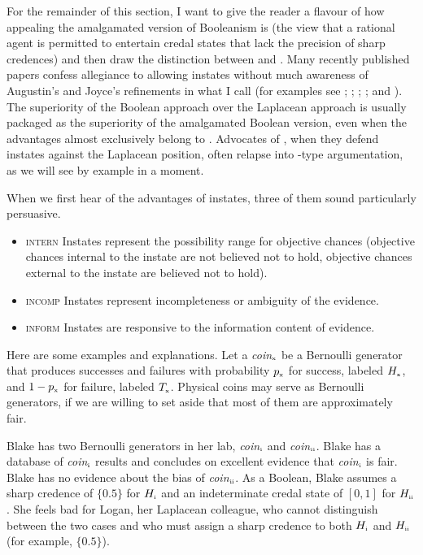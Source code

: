 \documentclass[phd,12pt,oneside]{ubcthesis}
\begin{document}
For the remainder of this section, I want to give the reader a flavour
of how appealing the amalgamated version of Booleanism is (the view
that a rational agent is permitted to entertain credal states that
lack the precision of sharp credences) and then draw the distinction
between {\anderson} and {\augustin}. Many recently published papers
confess allegiance to allowing instates without much awareness of
Augustin's and Joyce's refinements in what I call {\augustin} (for
examples see ; ;
; ; and
). The superiority of the Boolean approach over
the Laplacean approach is usually packaged as the superiority of the
amalgamated Boolean version, even when the advantages almost
exclusively belong to {\anderson}. Advocates of {\augustin}, when they
defend instates against the Laplacean position, often relapse into
{\anderson}-type argumentation, as we will see by example in a moment.

When we first hear of the advantages of instates, three of
them sound particularly persuasive.

\begin{itemize}
\item \textsc{intern} Instates represent the possibility range for
  objective chances (objective chances internal to the instate are not
  believed not to hold, objective chances external to the instate are
  believed not to hold).
\item \textsc{incomp} Instates represent incompleteness or
  ambiguity of the evidence.
\item \textsc{inform} Instates are responsive to the information
  content of evidence.
\end{itemize}

Here are some examples and explanations. Let a
\textit{coin}$_{\mbox{\tiny{x}}}$ be a Bernoulli generator that
produces successes and failures with probability $p_{\mbox{\tiny{x}}}$
for success, labeled $H_{\mbox{\tiny{x}}}$, and
$1-p_{\mbox{\tiny{x}}}$ for failure, labeled $T_{\mbox{\tiny{x}}}$.
Physical coins may serve as Bernoulli generators, if we are willing to
set aside that most of them are approximately fair.

\begin{quotex}
  \label{ex:range} Blake has two Bernoulli generators
  in her lab, \textit{coin}$_{\mbox{\tiny{i}}}$ and
  \textit{coin}$_{\mbox{\tiny{ii}}}$. Blake has a database of
  \textit{coin}$_{\mbox{\tiny{i}}}$ results and concludes on excellent
  evidence that \textit{coin}$_{\mbox{\tiny{i}}}$ is fair. Blake has
  no evidence about the bias of \textit{coin}$_{\mbox{\tiny{ii}}}$. As
  a Boolean, Blake assumes a sharp credence of $\{0.5\}$ for
  $H_{\mbox{\tiny{i}}}$ and an indeterminate credal state of $[0,1]$
  for $H_{\mbox{\tiny{ii}}}$. She feels bad for Logan, her Laplacean
  colleague, who cannot distinguish between the two cases and who must
  assign a sharp credence to both $H_{\mbox{\tiny{i}}}$ and
  $H_{\mbox{\tiny{ii}}}$ (for example, $\{0.5\}$).
\end{quotex}
\end{document}
